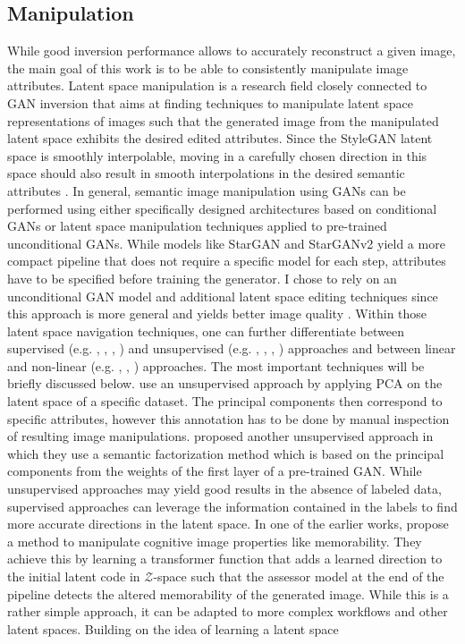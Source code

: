 \subsection{Manipulation}
While good inversion performance allows to accurately reconstruct a given image, the main goal of this work is to be able to consistently manipulate image attributes. Latent space manipulation is a research field closely connected to GAN inversion that aims at finding techniques to manipulate latent space representations of images such that the generated image from the manipulated latent space exhibits the desired edited attributes. Since the StyleGAN latent space is smoothly interpolable, moving in a carefully chosen direction in this space should also result in smooth interpolations in the desired semantic attributes \citep[p.6]{bermano2022state}. In general, semantic image manipulation using GANs can be performed using either specifically designed architectures based on conditional GANs or latent space manipulation techniques applied to pre-trained unconditional GANs. While models like StarGAN \citep{choi2018stargan} and StarGANv2 \citep{choi2020stargan} yield a more compact pipeline that does not require a specific model for each step, attributes have to be specified before training the generator. I chose to rely on an unconditional GAN model and additional latent space editing techniques since this approach is more general and yields better image quality \citep[p.2]{abdal2021styleflow}. Within those latent space navigation techniques, one can further differentiate between supervised (e.g. \cite{goetschalckx2019ganalyze}, \cite{shen2020interpreting}, \cite{wu2021stylespace}, \cite{yang2021discovering}) and unsupervised (e.g. \cite{ren2021learning}, \cite{yuksel2021latentclr}, \cite{harkonen2020ganspace}, \cite{shen2021closed}) approaches and between linear and non-linear (e.g. \cite{abdal2021styleflow}, \cite{li2023dystyle}, \cite{chen2022exploring}) approaches. The most important techniques will be briefly discussed below. \cite{harkonen2020ganspace} use an unsupervised approach by applying PCA on the latent space of a specific dataset. The principal components then correspond to specific attributes, however this annotation has to be done by manual inspection of resulting image manipulations. \cite{shen2021closed} proposed another unsupervised approach in which they use a semantic factorization method which is based on the principal components from the weights of the first layer of a pre-trained GAN. While unsupervised approaches may yield good results in the absence of labeled data, supervised approaches can leverage the information contained in the labels to find more accurate directions in the latent space. In one of the earlier works, \cite{goetschalckx2019ganalyze} propose a method to manipulate cognitive image properties like memorability. They achieve this by learning a transformer function that adds a learned direction to the initial latent code in $\mathcal{Z}$-space such that the assessor model at the end of the pipeline detects the altered memorability of the generated image. While this is a rather simple approach, it can be adapted to more complex workflows and other latent spaces. Building on the idea of learning a latent space 